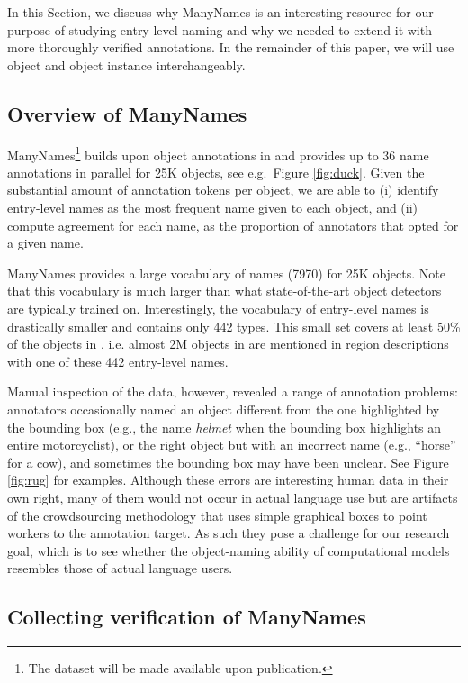 In this Section, we discuss why ManyNames is an interesting resource for our purpose of studying entry-level naming and why we needed to extend it with more thoroughly verified annotations. 
In the remainder of this paper, we will use object and object instance interchangeably.

\subsection{Overview of ManyNames}
\label{sect:mn_overview}


ManyNames\footnote{The dataset will be made available upon publication.} builds upon object annotations in \vg and provides up to 36 name annotations in parallel for 25K objects, see e.g.\ Figure \ref{fig:duck}.
Given the substantial amount of annotation tokens per object, we are able to (i) identify entry-level names as the most frequent name given to each object, and (ii) compute agreement for each name, as the proportion of annotators that opted for a given name.

ManyNames provides a large vocabulary of names (7970) for 25K objects.
Note that this vocabulary is much larger than what state-of-the-art object detectors are typically trained on. 
Interestingly, the vocabulary of entry-level names is drastically smaller and contains only 442 types. 
This small set covers at least 50\% of the objects in \vg, i.e. almost 2M objects in \vg are mentioned in region descriptions with one of these 442 entry-level names.

Manual inspection of the \mn data, however, revealed a range of annotation problems: annotators occasionally named an object different from the one highlighted by the bounding box (e.g., the name \emph{helmet} when the bounding box highlights an entire motorcyclist), or the right object but with an incorrect name (e.g., ``horse'' for a cow), and sometimes the bounding box may have been unclear. See Figure \ref{fig:rug} for examples.
Although these errors are interesting human data in their own right, many of them would not occur in actual language use but are artifacts of the crowdsourcing methodology that uses simple graphical boxes to point workers to the annotation target.
As such they pose a challenge for our research goal, which is to see whether the object-naming ability of computational models resembles those of actual language users.

\subsection{Collecting verification of ManyNames}
\label{sect:mn_verification}

